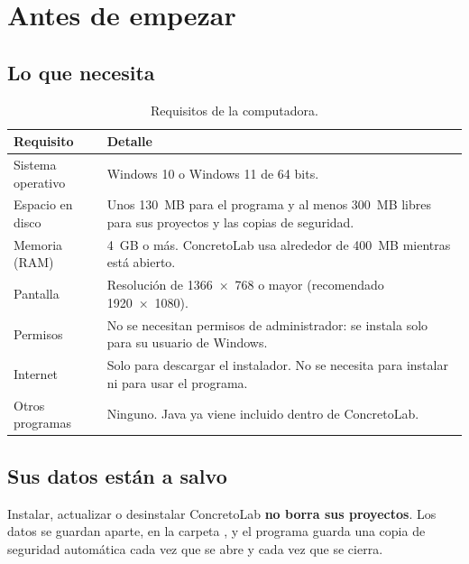 \section{Antes de empezar}

\subsection{Lo que necesita}

\begin{table}[H]
	\centering
	\caption{Requisitos de la computadora.}
	\label{tab:requisitos}
	\begin{tabular}{L{4.2cm}L{9.6cm}}
		\hline
		\textbf{Requisito} & \textbf{Detalle} \\ \hline
		Sistema operativo & Windows 10 o Windows 11 de 64 bits. \\
		Espacio en disco & Unos 130~MB para el programa y al menos 300~MB libres para sus proyectos y las copias de
		                   seguridad. \\
		Memoria (RAM) & 4~GB o más. ConcretoLab usa alrededor de 400~MB mientras está abierto. \\
		Pantalla & Resolución de 1366~×~768 o mayor (recomendado 1920~×~1080). \\
		Permisos & No se necesitan permisos de administrador: se instala solo para su usuario de Windows. \\
		Internet & Solo para descargar el instalador. No se necesita para instalar ni para usar el programa. \\
		Otros programas & Ninguno. Java ya viene incluido dentro de ConcretoLab. \\ \hline
	\end{tabular}
\end{table}

\subsection{Sus datos están a salvo}

Instalar, actualizar o desinstalar ConcretoLab \textbf{no borra sus proyectos}. Los datos se guardan aparte, en la carpeta
, y el programa guarda una copia de
seguridad automática cada vez que se abre y cada vez que se cierra.
